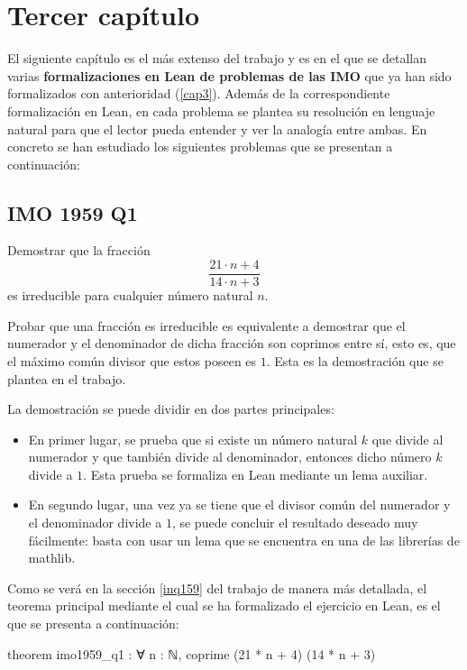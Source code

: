 \section*{Tercer capítulo}

El siguiente capítulo es el más extenso del trabajo y es en el que se
detallan varias \textbf{formalizaciones en Lean de problemas de las IMO}
que ya han sido formalizados con anterioridad (\ref{cap3}). Además de la
correspondiente formalización en Lean, en cada problema se plantea su
resolución en lenguaje natural para que el lector pueda entender y ver
la analogía entre ambas. En concreto se han estudiado los siguientes
problemas que se presentan a continuación:

\subsection*{IMO 1959 Q1}

\noindent
Demostrar que la fracción
\[\frac{21⋅n+4}{14⋅n+3}\]
es irreducible para cualquier número natural \(n\).

Probar que una fracción es irreducible es equivalente a demostrar que el
numerador y el denominador de dicha fracción son coprimos entre sí, esto
es, que el máximo común divisor que estos poseen es \(1\). Esta es la
demostración que se plantea en el trabajo.

La demostración se puede dividir en dos partes principales:
\begin{itemize}
\item En primer lugar, se prueba que si existe un número natural \(k\)
  que divide al numerador y que también divide al denominador, entonces
  dicho número \(k\) divide a \(1\). Esta prueba se formaliza en Lean
  mediante un lema auxiliar.

\item En segundo lugar, una vez ya se tiene que el divisor común del
  numerador y el denominador divide a \(1\), se puede concluir el
  resultado deseado muy fácilmente: basta con usar un lema que se
  encuentra en una de las librerías de mathlib.
\end{itemize}

Como se verá en la sección \ref{inq159} del trabajo de manera más
detallada, el teorema principal mediante el cual se ha formalizado el
ejercicio en Lean, es el que se presenta a continuación:
\begin{leancode}
theorem imo1959_q1 : ∀ n : ℕ, coprime (21 * n + 4) (14 * n + 3)
\end{leancode}

